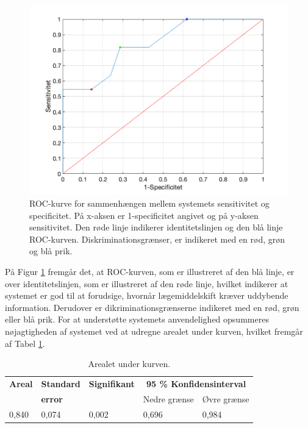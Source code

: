 \begin{figure}[H]\centering
\includegraphics[width=1\textwidth]{billeder/ROC11.png} 
	\caption{ROC-kurve for sammenhængen mellem systemets sensitivitet og specificitet. På x-aksen er 1-specificitet angivet og på y-aksen sensitivitet. Den røde linje indikerer identitetslinjen og den blå linje ROC-kurven. Diskriminationsgrænser, er indikeret med en rød, grøn og blå prik.}
	\label{fig:ROC}  
\end{figure}

På Figur \ref{fig:ROC} fremgår det, at ROC-kurven, som er illustreret af den blå linje, er over identitetslinjen, som er illustreret af den røde linje, hvilket indikerer at systemet er god til at forudsige, hvornår lægemiddelskift kræver uddybende information. Derudover er dikriminationsgrænserne indikeret med en rød, grøn eller blå prik. For at understøtte systemets anvendelighed opsummeres nøjagtigheden af systemet ved at udregne arealet under kurven, hvilket fremgår af Tabel \ref{table:AUC}.

\begin{table}[H]
\caption{Arealet under kurven.}
\label{table:AUC}
\centering
\begin{tabular}{|l|l|l|l|l|} \hline
 \rowcolor[HTML]{C0C0C0} \textbf{Areal}  &  \textbf{Standard}                       & \textbf{Signifikant} &
 \multicolumn{2}{|c|}{\textbf{95 \% Konfidensinterval}}  \\ 
  \rowcolor[HTML]{C0C0C0}                                                          & \textbf{error} &  & Nedre grænse      & Øvre grænse    \\ \hline
0,840 & 0,074 & 0,002 & 0,696 & 0,984 \\ \hline
\end{tabular}
\end{table}
\vspace{0.2cm}

